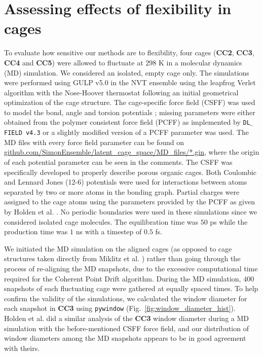 \documentclass[journal=jacsat,manuscript=article]{achemso}
\begin{document}
\newpage
\clearpage

\section{Assessing effects of flexibility in cages} 
\label{sec:flexibility}

To evaluate how sensitive our methods are to flexibility, four cages (\textbf{CC2}, \textbf{CC3}, \textbf{CC4} and \textbf{CC5}) were allowed to fluctuate at $298$ K in a molecular dynamics (MD) simulation. We considered an isolated, empty cage only. The simulations were performed using GULP v5.0 \cite{gale1997gulp} in the NVT ensemble using the leapfrog Verlet algorithm with the Nose-Hoover thermostat following an initial geometrical optimization of the cage structure. The cage-specific force field (CSFF) was used to model the bond, angle and torsion potentials \cite{holden2012bespoke}; missing parameters were either obtained from the polymer consistent force field (PCFF) \cite{sun1994ab,sun1994force,sun1995ab} as implemented by \texttt{DL$\_$FIELD v4.3} \cite{yong2016dlfield} or a slightly modified version of a PCFF parameter was used. The MD files with every force field parameter can be found on \url{github.com/SimonEnsemble/latent_cage_space/MD_files/*.gin}, where the origin of each potential parameter can be seen in the comments. The CSFF was specifically developed to properly describe porous organic cages. Both Coulombic and Lennard Jones (12-6) potentials were used for interactions between atoms separated by two or more atoms in the bonding graph. Partial charges were assigned to the cage atoms using the parameters provided by the PCFF as given by Holden et al. \cite{holden2012bespoke}. No periodic boundaries were used in these simulations since we considered isolated cage molecules. The equilibration time was $50$ ps while the production time was $1$ ns with a timestep of $0.5$ fs.

We initiated the MD simulation on the aligned cages (as opposed to cage structures taken directly from Miklitz et al. \cite{miklitz2017computational}) rather than going through the process of re-aligning the MD snapshots, due to the excessive computational time required for the Coherent Point Drift algorithm. During the MD simulation, $400$ snapshots of each fluctuating cage were gathered at equally spaced times. To help confirm the validity of the simulations, we calculated the window diameter for each snapshot in \textbf{CC3} using \texttt{pywindow} (Fig.~\ref{fig:window_diameter_hist}). Holden et al.\cite{holden2012bespoke} did a similar analysis of the \textbf{CC3} window diameter during a MD simulation with the before-mentioned CSFF force field, and our distribution of window diameters among the MD snapshots appears to be in good agreement with theirs.
\end{document}

